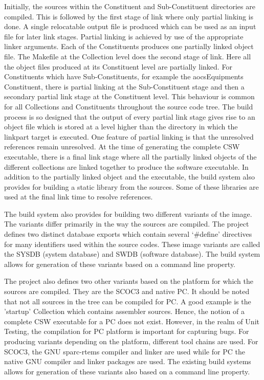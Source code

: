 \documentclass[12pt, a4paper, titlepage]{scrartcl}
\begin{document}
\par Initially, the sources within the Constituent and Sub-Constituent directories are compiled. This is followed by the first stage of link where only partial linking is done. A single relocatable output file is produced which can be used as an input file for later link stages. Partial linking is achieved by use of the appropriate linker arguments. Each of the Constituents produces one partially linked object file. The Makefile at the Collection level does the second stage of link. Here all the object files produced at its Constituent level are partially linked. For Constituents which have Sub-Constituents, for example the aocsEquipments Constituent, there is partial linking at the Sub-Constituent stage and then a secondary partial link stage at the Constituent level. This behaviour is common for all Collections and Constituents throughout the source code tree. The build process is so designed that the output of every partial link stage gives rise to an object file which is stored at a level higher than the directory in which the linkpart target is executed. One feature of partial linking is that the unresolved references remain unresolved. At the time of generating the complete CSW executable, there is a final link stage where all the partially linked objects of the different collections are linked together to produce the software executable. In addition to the partially linked object and the executable, the build system also provides for building a static library from the sources. Some of these libraries are used at the final link time to resolve references. 
\par The build system also provides for building two different variants of the image. The variants differ primarily in the way the sources are compiled. The project defines two distinct database exports which contain several ‘\#define’ directives for many identifiers used within the source codes. These image variants are called the SYSDB (system database) and SWDB (software database). The build system allows for generation of these variants based on a command line property. 
\par The project also defines two other variants based on the platform for which the sources are compiled. They are the SCOC3\cite{koebel2010scoc3} and native PC. It should be noted that not all sources in the tree can be compiled for PC. A good example is the 'startup' Collection which contains assembler sources. Hence, the notion of a complete CSW executable for a PC does not exist. However, in the realm of Unit Testing, the compilation for PC platform is  important for capturing bugs. For producing variants depending on the platform, different tool chains are used. For SCOC3, the GNU sparc-rtems compiler and linker are used while for PC the native GNU compiler and linker packages are used. The existing build systems allows for generation of these variants also based on a command line property.
\end{document}
